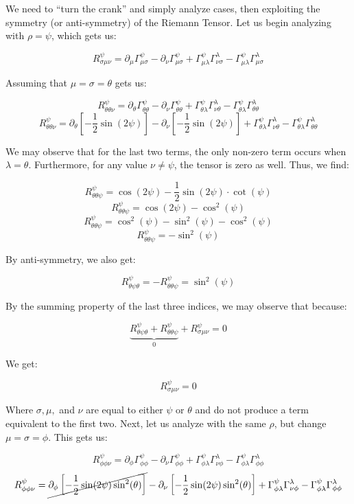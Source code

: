 \begin{enumerate}
\begin{enumerate}
        We need to ``turn the crank'' and simply analyze cases, then exploiting the symmetry (or anti-symmetry) of the Riemann Tensor. Let us begin analyzing with $\rho=\psi$, which gets us:

        $$R^{\psi}_{\sigma\mu\nu}=\partial_{\mu}\Gamma^{\psi}_{\mu\sigma}-\partial_{\nu}\Gamma^{\psi}_{\mu\sigma}+\Gamma^{\psi}_{\mu\lambda}\Gamma^{\lambda}_{\nu\sigma}-\Gamma^{\psi}_{\mu\lambda}\Gamma^{\lambda}_{\mu\sigma}$$

        Assuming that $\mu=\sigma=\theta$ gets us:

        $$R^{\psi}_{\theta\theta\nu}=\partial_{\theta}\Gamma^{\psi}_{\theta\theta}-\partial_{\nu}\Gamma^{\psi}_{\theta\theta}+\Gamma^{\psi}_{\theta\lambda}\Gamma^{\lambda}_{\nu\theta}-\Gamma^{\psi}_{\theta\lambda}\Gamma^{\lambda}_{\theta\theta}$$
        $$R^{\psi}_{\theta\theta\nu}=\partial_{\theta}\left[ -\frac{1}{2}\sin(2\psi) \right]-\partial_{\nu}\left[ -\frac{1}{2}\sin(2\psi) \right]+\Gamma^{\psi}_{\theta\lambda}\Gamma^{\lambda}_{\nu\theta}-\Gamma^{\psi}_{\theta\lambda}\Gamma^{\lambda}_{\theta\theta}$$

        We may observe that for the last two terms, the only non-zero term occurs when $\lambda=\theta$. Furthermore, for any value $\nu\neq \psi$, the tensor is zero as well. Thus, we find:

        $$R^{\psi}_{\theta\theta\psi}=\cos(2\psi)-\frac{1}{2}\sin(2\psi)\cdot\cot(\psi)$$
        $$R^{\psi}_{\theta\theta\psi}=\cos(2\psi)-\cos^2(\psi)$$
        $$R^{\psi}_{\theta\theta\psi}=\cos^2(\psi)-\sin^2(\psi)-\cos^2(\psi)$$
        $$R^{\psi}_{\theta\theta\psi}=-\sin^2(\psi)$$

        By anti-symmetry, we also get:

        $$\boxed{R^{\psi}_{\theta\psi\theta}=-R^{\psi}_{\theta\theta\psi}=\sin^2(\psi)}$$

        By the summing property of the last three indices, we may observe that because:

        $$\underbrace{R^{\psi}_{\theta\psi\theta}+R^{\psi}_{\theta\theta\psi}}_0+R^{\psi}_{\sigma\mu\nu}=0$$

        We get:

        $$R^{\psi}_{\sigma\mu\nu}=0$$

        Where $\sigma,\mu,$ and $\nu$ are equal to either $\psi$ or $\theta$ and do not produce a term equivalent to the first two. Next, let us analyze with the same $\rho$, but change $\mu=\sigma=\phi$. This gets us:

        $$R^{\psi}_{\phi\phi\nu}=\partial_{\phi}\Gamma^{\psi}_{\phi\phi}-\partial_{\nu}\Gamma^{\psi}_{\phi\phi}+\Gamma^{\psi}_{\phi\lambda}\Gamma^{\lambda}_{\nu\phi}-\Gamma^{\psi}_{\phi\lambda}\Gamma^{\lambda}_{\phi\phi}$$
        $$R^{\psi}_{\phi\phi\nu}=\cancel{\partial_{\phi}\left[ -\frac{1}{2}\sin(2\psi)\sin^2(\theta) \right]}-\partial_{\nu}\left[ -\frac{1}{2}\sin(2\psi)\sin^2(\theta) \right]+\Gamma^{\psi}_{\phi\lambda}\Gamma^{\lambda}_{\nu\phi}-\Gamma^{\psi}_{\phi\lambda}\Gamma^{\lambda}_{\phi\phi}$$


\end{enumerate}
\end{enumerate}
